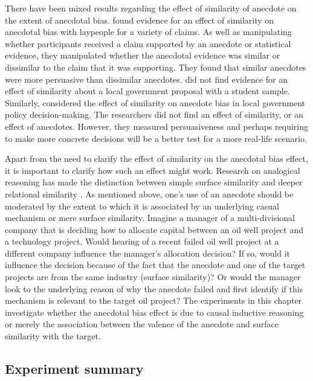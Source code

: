 \documentclass[a4paper, nobind, dvipsnames]{templates/ociamthesis}
\theoremstyle{definition}
\theoremstyle{definition}
\theoremstyle{definition}
\theoremstyle{definition}
\theoremstyle{remark}
\begin{document}
There have been mixed results regarding the effect of similarity of anecdote on
the extent of anecdotal bias. \textcite[Study 3]{hoeken2009} found evidence for an effect
of similarity on anecdotal bias with laypeople for a variety of claims. As well
as manipulating whether participants received a claim supported by an anecdote
or statistical evidence, they manipulated whether the anecdotal evidence was
similar or dissimilar to the claim that it was supporting. They found that
similar anecdotes were more persuasive than dissimilar anecdotes. \textcite{hoeken2001}
did not find evidence for an effect of similarity about a local government
proposal with a student sample. Similarly, \textcite{hornikx2018} considered the effect of
similarity on anecdote bias in local government policy decision-making. The
researchers did not find an effect of similarity, or an effect of anecdotes.
However, they measured persuasiveness and perhaps requiring to make more
concrete decisions will be a better test for a more real-life scenario.

Apart from the need to clarify the effect of similarity on the anecdotal bias
effect, it is important to clarify how such an effect might work. Research on
analogical reasoning has made the distinction between simple surface similarity
and deeper relational similarity \autocite{gentner1983}. As mentioned above, one's use
of an anecdote should be moderated by the extent to which it is associated by an
underlying casual mechanism or mere surface similarity. Imagine a manager of a
multi-divisional company that is deciding how to allocate capital between an oil
well project and a technology project. Would hearing of a recent failed oil well
project at a different company influence the manager's allocation decision? If
so, would it influence the decision because of the fact that the anecdote and
one of the target projects are from the same industry (surface similarity)? Or
would the manager look to the underlying reason of why the anecdote failed and
first identify if this mechanism is relevant to the target oil project? The
experiments in this chapter investigate whether the anecdotal bias effect is due
to causal inductive reasoning or merely the association between the valence of
the anecdote and surface similarity with the target.

\subsection{Experiment summary}
\end{document}
